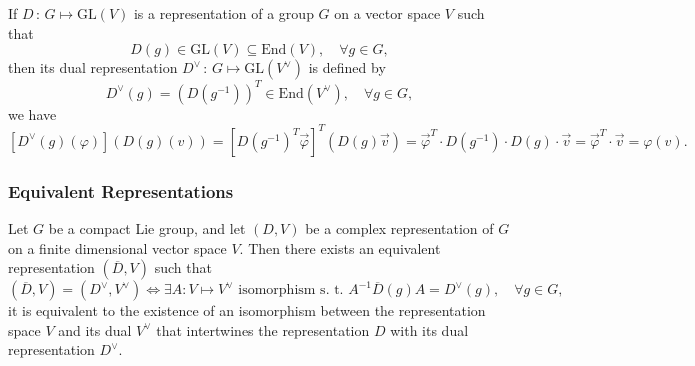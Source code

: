 If \(D \, : \, G \mapsto \mathrm{GL}(V)\) is a representation of a group \(G\) on a vector space \(V\) such that
\[
    D(g) \in \mathrm{GL}(V) \subseteq \mathrm{End}(V), \quad \forall g \in G,
\]
then its dual representation \(D^{\vee} \, : \, G \mapsto \mathrm{GL}(V^{\vee})\) is defined by
\[
    D^{\vee}(g) = (D(g^{-1}))^T \in \mathrm{End}(V^{\vee}), \quad \forall g \in G,
\]
we have
\[
    [D^{\vee}(g)(\varphi)](D(g)(v)) = [D(g^{-1})^T\vec{\varphi}]^T(D(g)\vec{v}) = \vec{\varphi}^T \cdot D(g^{-1}) \cdot D(g) \cdot \vec{v} = \vec{\varphi}^T \cdot \vec{v} = \varphi(v).
\]



\subsubsection{Equivalent Representations}

\begin{proposition}
    Let \(G\) be a compact Lie group, and let \((D,V)\) be a complex representation of \(G\) on a finite dimensional vector space \(V\). Then there exists an equivalent representation \((\overline{D},V)\) such that
    \[
        (\overline{D},V) = (D^{\vee},V^{\vee}) \iff \exists A : V \mapsto V^{\vee} \text{ isomorphism s. t. } A^{-1} \overline{D}(g) A = D^{\vee}(g), \quad \forall g \in G,
    \]
    it is equivalent to the existence of an isomorphism between the representation space \(V\) and its dual \(V^{\vee}\) that intertwines the representation \(D\) with its dual representation \(D^{\vee}\).
\end{proposition}

